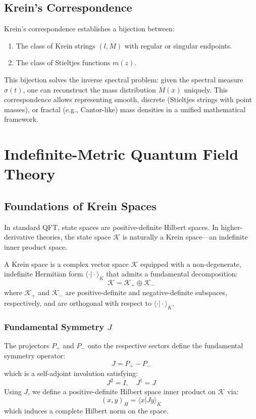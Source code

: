 \documentclass{article}
\begin{document}
\subsection{Krein's Correspondence}
Krein's correspondence establishes a bijection between:
\begin{enumerate}
    \item The class of Krein strings $(l, M)$ with regular or singular endpoints.
    \item The class of Stieltjes functions $m(z)$.
\end{enumerate}
This bijection solves the inverse spectral problem: given the spectral measure $\sigma(t)$, one can reconstruct the mass distribution $M(x)$ uniquely. This correspondence allows representing smooth, discrete (Stieltjes strings with point masses), or fractal (e.g., Cantor-like) mass densities in a unified mathematical framework.

\section{Indefinite-Metric Quantum Field Theory}
\label{sec:qft}

\subsection{Foundations of Krein Spaces}
\label{sec:foundations}

In standard QFT, state spaces are positive-definite Hilbert spaces. In higher-derivative theories, the state space $\mathcal{K}$ is naturally a Krein space—an indefinite inner product space.

\begin{definition}
A Krein space is a complex vector space $\mathcal{K}$ equipped with a non-degenerate, indefinite Hermitian form $\langle \cdot \vert \cdot \rangle_K$ that admits a fundamental decomposition:
\begin{equation}
    \mathcal{K} = \mathcal{K}_+ \oplus \mathcal{K}_-
\end{equation}
where $\mathcal{K}_+$ and $\mathcal{K}_-$ are positive-definite and negative-definite subspaces, respectively, and are orthogonal with respect to $\langle \cdot \vert \cdot \rangle_K$.
\end{definition}

\subsubsection{Fundamental Symmetry $J$}
The projectors $P_+$ and $P_-$ onto the respective sectors define the fundamental symmetry operator:
\begin{equation}
    J = P_+ - P_-
\end{equation}
which is a self-adjoint involution satisfying:
\begin{equation}
    J^2 = I, \quad J^\dagger = J
\end{equation}
Using $J$, we define a positive-definite Hilbert space inner product on $\mathcal{K}$ via:
\begin{equation}
    (x, y)_H = \langle x \vert J y \rangle_K
\end{equation}
which induces a complete Hilbert norm on the space.
\end{document}
